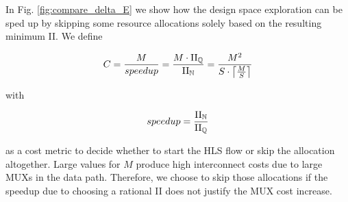 In Fig. \ref{fig:compare_delta_E} we show how the design space exploration can be sped up by skipping some resource allocations solely based on the resulting minimum II.
We define

\begin{equation}
    \label{eq:tradeoff_alloc}
    C = \frac{M}{speedup} = \frac{M \cdot \mathrm{II}_{\mathbb{Q}}}{\mathrm{II}_{\mathbb{N}}} = \frac{M^2}{S \cdot \left \lceil \frac{M}{S} \right \rceil} 
\end{equation}

with

\begin{equation}
    \label{eq:speedup}
    speedup = \frac{\mathrm{II}_{\mathbb{N}}}{\mathrm{II}_{\mathbb{Q}}}
\end{equation}

as a cost metric to decide whether to start the HLS flow or skip the allocation altogether. Large values for $M$ produce high interconnect costs due to large MUXs in the data path. 
Therefore, we choose to skip those allocations if the speedup due to choosing a rational II does not justify the MUX cost increase.

